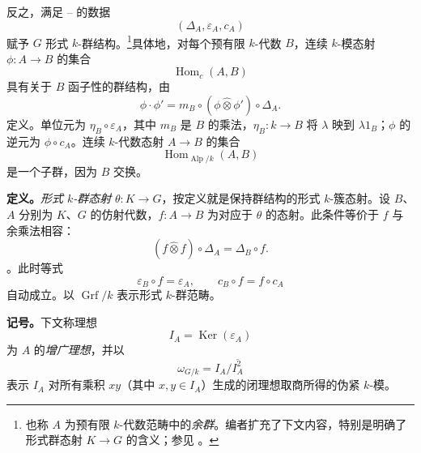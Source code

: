 反之，满足 \textup{}--\textup{} 的数据 \[
  (\Delta_A,\varepsilon_A,c_A)
\] 赋予 \(G\) 形式 \(k\)-群结构。\footnote{\label{sga3:VIIB:nde:76}也称 \(A\) 为预有限 \(k\)-代数范畴中的\emph{余群}。编者扩充了下文内容，特别是明确了形式群态射 \(K\to G\) 的含义；参见 。}具体地，对每个预有限 \(k\)-代数 \(B\)，连续 \(k\)-模态射 \(\phi:A\to B\) 的集合 \[
  \operatorname{Hom}_c(A,B)
\] 具有关于 \(B\) 函子性的群结构，由 \[
  \phi\cdot\phi'
  =
  m_B\circ
  (\phi\widehat\otimes\phi')
  \circ\Delta_A.
\] 定义。单位元为 \(\eta_B\circ\varepsilon_A\)，其中 \(m_B\) 是 \(B\) 的乘法，\(\eta_B:k\to B\) 将 \(\lambda\) 映到 \(\lambda1_B\)；\(\phi\) 的逆元为 \(\phi\circ c_A\)。连续 \(k\)-代数态射 \(A\to B\) 的集合 \[
  \operatorname{Hom}_{\operatorname{Alp}/k}(A,B)
\] 是一个子群，因为 \(B\) 交换。

\medskip\noindent\textbf{定义。} \label{sga3:VIIB:2.1.definition}\emph{形式 \(k\)-群态射} \(\theta:K\to G\)，按定义就是保持群结构的形式 \(k\)-簇态射。设 \(B\)、\(A\) 分别为 \(K\)、\(G\) 的仿射代数，\(f:A\to B\) 为对应于 \(\theta\) 的态射。此条件等价于 \(f\) 与余乘法相容：\[
  (f\widehat\otimes f)\circ\Delta_A
  =
  \Delta_B\circ f.
\]。此时等式 \[
  \varepsilon_B\circ f=\varepsilon_A,
  \qquad
  c_B\circ f=f\circ c_A
\] 自动成立。以 \(\operatorname{Grf}/k\) 表示形式 \(k\)-群范畴。

\medskip\noindent\textbf{记号。} \label{sga3:VIIB:2.1.notation}下文称理想 \[
  I_A=\operatorname{Ker}(\varepsilon_A)
\] 为 \(A\) 的\emph{增广理想}，并以 \[
  \omega_{G/k}=I_A/\overline{I_A^2}
\] 表示 \(I_A\) 对所有乘积 \(xy\)（其中 \(x,y\in I_A\)）生成的闭理想取商所得的伪紧 \(k\)-模。
